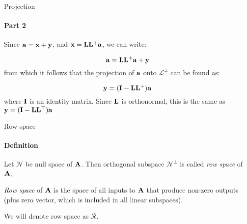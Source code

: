 \documentclass{beamer}
\begin{document}
\begin{frame}{Projection}
\framesubtitle{Part 2}
\begin{flushleft}

Since $\mathbf{a} = \mathbf{x} + \mathbf{y}$, and $\mathbf{x} = \mathbf{L} \mathbf{L}^+ \mathbf{a}$, we can write:

\begin{equation}
    \mathbf{a} = \mathbf{L} \mathbf{L}^+ \mathbf{a} + \mathbf{y}
\end{equation}
%
from which it follows that the projection of $\mathbf{a}$ onto $\mathcal{L}^\perp$ can be found as: 

\begin{equation}
    \mathbf{y} = (\mathbf{I} - \mathbf{L} \mathbf{L}^+) \mathbf{a}
\end{equation}
%
where $\mathbf{I}$ is an identity matrix. Since $\mathbf{L}$ is orthonormal, this is the same as $\mathbf{y} = (\mathbf{I} - \mathbf{L} \mathbf{L}^\top) \mathbf{a}$

\end{flushleft}
\end{frame}




\begin{frame}{Row space}
\framesubtitle{Definition}
\begin{flushleft}

\begin{definition}
Let $\mathcal{N}$ be null space of $\mathbf{A}$. Then orthogonal subspace $\mathcal{N}^\perp$ is called \emph{row space} of $\mathbf{A}$.
\end{definition}

\begin{definition}
\emph{Row space} of $\mathbf{A}$ is the space of all inputs to $\mathbf{A}$ that produce non-zero outputs (plus zero vector, which is included in all linear subspaces).
\end{definition}

\bigskip

We will denote row space as $\mathcal{R}$.

\end{flushleft}
\end{frame}
\end{document}

